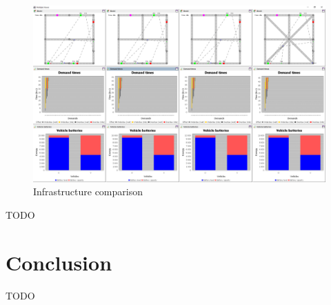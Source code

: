 \documentclass[10pt,twocolumn]{article}
\begin{document}
\begin{figure}[tbp]
    \includegraphics[width=\textwidth]{../../screenshots/infrastructure-comparison.png}
    \caption{Infrastructure comparison}
    \label{fig:infratructure-comparison}
\end{figure}

TODO

\section{Conclusion}
\label{sec:conclusion}

TODO



\end{document}
